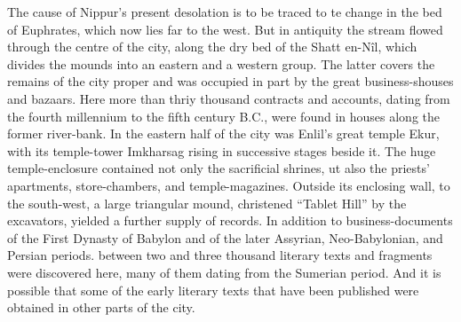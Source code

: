 \documentclass[12pt,oneside]{book}
\begin{document}
The cause of Nippur's present desolation is to be traced to te change in the bed of Euphrates, which now lies far to the west. But in antiquity the stream flowed through the centre of the city, along the dry bed of the Shatt en-N\^il, which divides the mounds into an eastern and a western group. The latter covers the remains of the city proper and was occupied in part by the great business-shouses and bazaars. Here more than thriy thousand contracts and accounts, dating from the fourth millennium to the fifth century B.C., were found in houses along the former river-bank. In the eastern half of the city was Enlil's great temple Ekur, with its temple-tower Imkharsag rising in successive stages beside it. The huge temple-enclosure contained not only the sacrificial shrines, ut also the priests' apartments, store-chambers, and temple-magazines. Outside its enclosing wall, to the south-west, a large triangular mound, christened ``Tablet Hill'' by the excavators, yielded a further supply of records. In addition to business-documents of the First Dynasty of Babylon and of the later Assyrian, Neo-Babylonian, and Persian periods. between two and three thousand literary texts and fragments were discovered here, many of them dating from the Sumerian period. And it is possible that some of the early literary texts that have been published were obtained in other parts of the city. \par 
\end{document}
